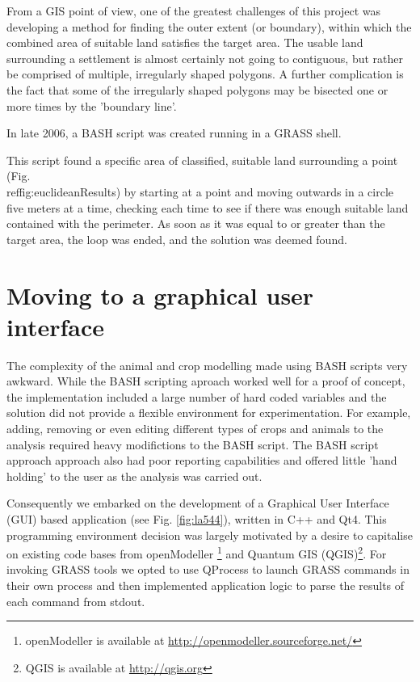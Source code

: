 From a GIS point of view, one of the greatest challenges of this project was
developing a method for finding the outer extent (or boundary), within which
the combined area of suitable land satisfies the target area.  The usable land
surrounding a settlement is almost certainly not going to contiguous, but
rather be comprised of multiple, irregularly shaped polygons. A further
complication is the fact that some of the irregularly shaped polygons may
be bisected one or more times by the 'boundary line'.  

In late 2006, a BASH script was created running in a GRASS shell.

This script found a specific area of classified, suitable land surrounding a
point (Fig.\\ref{fig:euclideanResults})  by starting at a point and moving
outwards in a circle five meters at a time, checking each time to see if there
was enough suitable land contained with the perimeter.  As soon as it was equal
to or greater than the target area, the loop was ended, and the solution was
deemed found.

\section{Moving to a graphical user interface} \label{GUI} 
 
The complexity of the animal and crop modelling made using BASH scripts very
awkward.  While the BASH scripting aproach worked well for a proof of concept,
the implementation included a large number of hard coded variables and the
solution 
did not provide a flexible environment for experimentation. For example, adding,
removing or even 
editing different types of crops and animals to the analysis required heavy
modifictions 
to the BASH script.  The BASH script approach approach also had poor reporting
capabilities and offered little 'hand holding' to the user as the analysis was 
carried out.

Consequently we embarked on the development of a Graphical User Interface (GUI)
based 
application (see Fig. \ref{fig:la544}), written in C++ and Qt4. This programming
environment decision was largely 
motivated by a desire to capitalise on existing code bases from openModeller
\footnote{openModeller is available at
\url{http://openmodeller.sourceforge.net/}} 
and Quantum GIS (QGIS)\footnote{QGIS is available at \url{http://qgis.org}}.  
For invoking GRASS tools we opted to use QProcess to launch GRASS commands in 
their own process and then implemented application logic to parse the results
of 
each command from stdout.

